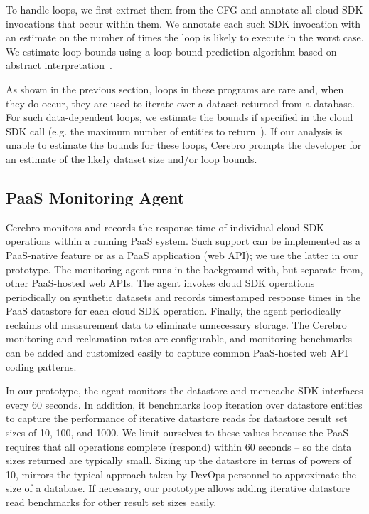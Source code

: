 To handle loops, we first extract them from the CFG and 
annotate all cloud SDK invocations that occur within them.
We annotate each such SDK invocation with an estimate on the number of times
the loop is likely to execute in the worst case. 
We estimate loop bounds using a loop bound prediction algorithm 
based on abstract interpretation~\cite{bygde2010static}. 

As shown in the previous section, loops in these programs 
are rare and, when they do occur, they are
used to iterate over a dataset returned from a database.
For such data-dependent loops, we estimate the bounds if specified 
in the cloud SDK call (e.g. the maximum number of 
entities to return~\cite{gae-fetch-options}).
If our analysis is unable to estimate the bounds for these loops, Cerebro prompts
the developer for an estimate of the likely dataset size and/or loop bounds.

\subsection{PaaS Monitoring Agent}
Cerebro monitors and records the response time of individual
cloud SDK operations within a running PaaS system.  Such support can be 
implemented as a PaaS-native feature or as
a PaaS application (web API); we use the latter in our prototype.
The monitoring agent runs in the background with, but separate from, 
other PaaS-hosted web APIs.
The agent invokes cloud SDK operations periodically on synthetic datasets and 
records timestamped response times in the PaaS datastore for each cloud SDK
operation.
Finally, the agent periodically reclaims old measurement data
to eliminate unnecessary storage. The Cerebro monitoring and reclamation 
rates are configurable, and monitoring benchmarks can be added and customized
easily to capture common PaaS-hosted web API coding patterns.

In our prototype, the agent monitors the datastore and memcache SDK interfaces
every 60 seconds. In addition, it 
benchmarks loop iteration over datastore entities to capture
the performance of iterative datastore reads for datastore result set sizes 
of 10, 100, and 1000. We limit ourselves to these values because the PaaS requires
that all operations complete (respond) within 60 seconds -- so the data
sizes returned are typically small. Sizing up the datastore in terms of powers of 10,
mirrors the typical approach taken by DevOps personnel
to approximate the size of a database. If necessary, our prototype allows adding iterative
datastore read benchmarks for other result set sizes easily. 

